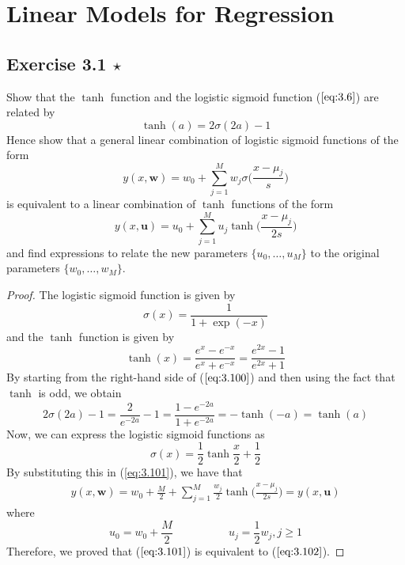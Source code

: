 \chapter{Linear Models for Regression}

\section*{Exercise 3.1 $\star$}
Show that the $\tanh$ function and the logistic
sigmoid function ($\ref{eq:3.6}$) are related by 
\begin{equation}\label{eq:3.100}\tag{3.100}
    \tanh(a) = 2\sigma(2a) - 1
\end{equation}
Hence show that a general linear combination of logistic sigmoid functions
of the form
\begin{equation}\label{eq:3.101}\tag{3.101}
    y(x, \mathbf{w}) = w_0 + \sum_{j=1}^{M} w_j \sigma\bigg(\frac{x-\mu_j}{s}\bigg)
\end{equation}
is equivalent to a linear combination of $\tanh$ functions of the form
\begin{equation}\label{eq:3.102}\tag{3.102}
    y(x, \mathbf{u}) = u_0 + \sum_{j=1}^{M} u_j \tanh\bigg(\frac{x-\mu_j}{2s}\bigg)
\end{equation}
and find expressions to relate the new parameters $\{u_0, \ldots, u_M\}$
to the original parameters $\{w_0, \ldots, w_M\}$.

\vspace{1em}

\begin{proof}
    The logistic sigmoid function is given by
    \begin{equation}\label{eq:3.6}\tag{3.6}
        \sigma(x) = \frac{1}{1 + \exp(-x)}
    \end{equation}
    and the $\tanh$ function is given by
    \begin{equation}
        \tanh(x) = \frac{e^x - e^{-x}}{e^x + e^{-x}} = \frac{e^{2x} - 1}{e^{2x} + 1}
    \end{equation}
    By starting from the right-hand side of ($\ref{eq:3.100}$) and then 
    using the fact that $\tanh$ is odd, we obtain 
    \begin{equation}\tag{3.100}
        2\sigma(2a) - 1 = \frac{2}{e^{-2a}} - 1 = \frac{1 - e^{-2a}}{1 + e^{-2a}}
        = -\tanh(-a) = \tanh(a)
    \end{equation}
    Now, we can express the logistic sigmoid functions as
    \[
        \sigma(x) = \frac{1}{2}\tanh\frac{x}{2} + \frac{1}{2}
    \] 
    By substituting this in (\ref{eq:3.101}), we have that
    \begin{align*}
        y(x, \mathbf{w}) = w_0 + \frac{M}{2} +  
        \sum_{j=1}^{M} \frac{w_j}{2} \tanh\bigg(\frac{x - \mu_j}{2s}\bigg)
        = y(x, \mathbf{u})
    \end{align*}
    where
    \[
        u_0 = w_0 + \frac{M}{2} 
        \hspace{5em}
        u_j = \frac{1}{2} w_j, j \geq 1
    \] 
    Therefore, we proved that ($\ref{eq:3.101}$) is equivalent to ($\ref{eq:3.102}$).
\end{proof}

